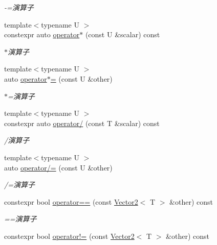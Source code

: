\begin{DoxyCompactItemize}
\begin{DoxyCompactList}\small\item\em -\/=演算子 \end{DoxyCompactList}\item 
{\footnotesize template$<$typename U $>$ }\\constexpr auto \mbox{\hyperlink{classsaki_1_1_vector2_aaaac42e1c348c453fad5ac0f2b7029d7}{operator$\ast$}} (const U \&scalar) const
\begin{DoxyCompactList}\small\item\em $\ast$演算子 \end{DoxyCompactList}\item 
{\footnotesize template$<$typename U $>$ }\\auto \mbox{\hyperlink{classsaki_1_1_vector2_a768d67bdb12d0e2bcac53fbebaf946aa}{operator$\ast$=}} (const U \&other)
\begin{DoxyCompactList}\small\item\em $\ast$=演算子 \end{DoxyCompactList}\item 
{\footnotesize template$<$typename U $>$ }\\constexpr auto \mbox{\hyperlink{classsaki_1_1_vector2_a1fb1f6ab6d21fcbc69624e99ab8ac5d2}{operator/}} (const T \&scalar) const
\begin{DoxyCompactList}\small\item\em /演算子 \end{DoxyCompactList}\item 
{\footnotesize template$<$typename U $>$ }\\auto \mbox{\hyperlink{classsaki_1_1_vector2_a1851ed51c40f0411fe845645a0b87951}{operator/=}} (const U \&other)
\begin{DoxyCompactList}\small\item\em /=演算子 \end{DoxyCompactList}\item 
constexpr bool \mbox{\hyperlink{classsaki_1_1_vector2_a72b70031ffca3596e8df06cc4e84dc51}{operator==}} (const \mbox{\hyperlink{classsaki_1_1_vector2}{Vector2}}$<$ T $>$ \&other) const
\begin{DoxyCompactList}\small\item\em ==演算子 \end{DoxyCompactList}\item 
constexpr bool \mbox{\hyperlink{classsaki_1_1_vector2_a060dff3676c9f427fba232c301e011b7}{operator!=}} (const \mbox{\hyperlink{classsaki_1_1_vector2}{Vector2}}$<$ T $>$ \&other) const

\end{DoxyCompactItemize}
